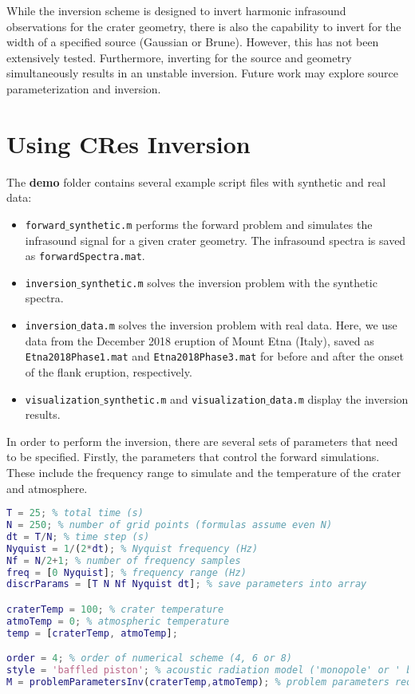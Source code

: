 \documentclass[10pt]{article}
\begin{document}
While the inversion scheme is designed to invert harmonic infrasound observations for the crater geometry, there is also the capability to invert for the width of a specified source (Gaussian or Brune). However, this has not been extensively tested. Furthermore, inverting for the source and geometry simultaneously results in an unstable inversion. Future work may explore source parameterization and inversion.

\section{Using {\bf CRes} Inversion}

The {\bf demo} folder contains several example script files with synthetic and real data:
\begin{itemize}
\item \texttt{forward$\_$synthetic.m} performs the forward problem and simulates the infrasound signal for a given crater geometry. The infrasound spectra is saved as \texttt{forwardSpectra.mat}.
\item \texttt{inversion$\_$synthetic.m} solves the inversion problem with the synthetic spectra.
\item \texttt{inversion$\_$data.m} solves the inversion problem with real data. Here, we use data from the December 2018 eruption of Mount Etna (Italy), saved as \texttt{Etna2018Phase1.mat} and \texttt{Etna2018Phase3.mat} for before and after the onset of the flank eruption, respectively.
\item \texttt{visualization$\_$synthetic.m} and \texttt{visualization$\_$data.m} display the inversion results. 
\end{itemize}

In order to perform the inversion, there are several sets of parameters that need to be specified. Firstly, the parameters that control the forward simulations. These include the frequency range to simulate and the temperature of the crater and atmosphere.
\begin{lstlisting}[language=Matlab]
% set the parameters for the resonance1d calculations 
T = 25; % total time (s)
N = 250; % number of grid points (formulas assume even N)
dt = T/N; % time step (s)
Nyquist = 1/(2*dt); % Nyquist frequency (Hz)
Nf = N/2+1; % number of frequency samples
freq = [0 Nyquist]; % frequency range (Hz)
discrParams = [T N Nf Nyquist dt]; % save parameters into array

craterTemp = 100; % crater temperature
atmoTemp = 0; % atmospheric temperature
temp = [craterTemp, atmoTemp]; 

order = 4; % order of numerical scheme (4, 6 or 8)
style = 'baffled piston'; % acoustic radiation model ('monopole' or ' baffled piston')
M = problemParametersInv(craterTemp,atmoTemp); % problem parameters required for resonance1d
\end{lstlisting}
\end{document}
